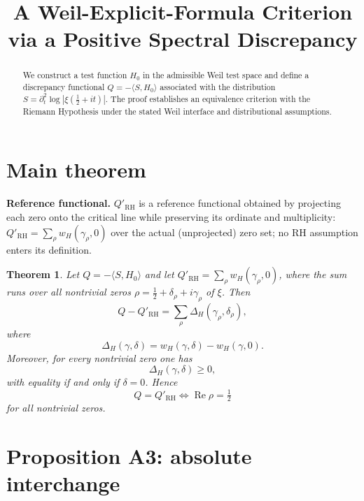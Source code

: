 \documentclass[11pt]{article}
\title{A Weil-Explicit-Formula Criterion via a Positive Spectral Discrepancy}
\author{}
\date{}
\newtheorem{theorem}{Theorem}
\begin{document}
\maketitle

\begin{abstract}
We construct a test function $H_0$ in the admissible Weil test space and
define a discrepancy functional $Q=-\langle S,H_0\rangle$ associated with
the distribution $S=\partial_t^2\log|\xi(\tfrac12+it)|$.  The proof
establishes an equivalence criterion with the Riemann Hypothesis under
the stated Weil interface and distributional assumptions.
\end{abstract}

\section{Main theorem}

\noindent\textbf{Reference functional.} $Q'_{\mathrm{RH}}$ is a reference
functional obtained by projecting each zero onto the critical line while
preserving its ordinate and multiplicity: $Q'_{\mathrm{RH}}=\sum_\rho
w_H(\gamma_\rho,0)$ over the actual (unprojected) zero set; no RH
assumption enters its definition.

\begin{theorem}\label{thm:main}
Let $Q=-\langle S,H_0\rangle$ and let
$Q'_{\mathrm{RH}}=\sum_\rho w_H(\gamma_\rho,0)$, where the sum runs over
all nontrivial zeros $\rho=\tfrac12+\delta_\rho+i\gamma_\rho$ of
$\xi$.  Then
\begin{equation}
Q-Q'_{\mathrm{RH}}
=
\sum_\rho \Delta_H(\gamma_\rho,\delta_\rho),
\label{eq:main}
\end{equation}
where
\begin{equation}
\Delta_H(\gamma,\delta)=w_H(\gamma,\delta)-w_H(\gamma,0).
\label{eq:disc}
\end{equation}
Moreover, for every nontrivial zero one has
\begin{equation}
\Delta_H(\gamma,\delta)\ge 0,
\end{equation}
with equality if and only if $\delta=0$.  Hence
\begin{equation}
Q=Q'_{\mathrm{RH}}
\iff
\operatorname{Re}\rho=\tfrac12
\end{equation}
for all nontrivial zeros.
\end{theorem}

\section{Proposition A3: absolute interchange}
\end{document}
